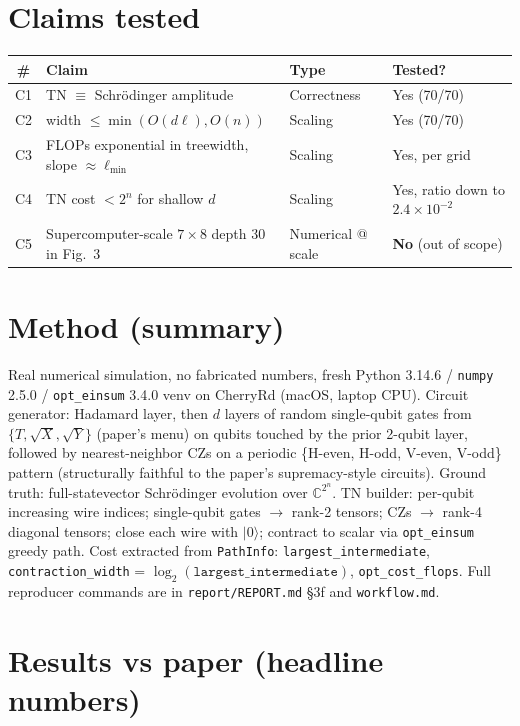 \documentclass[11pt]{article}
\begin{document}
\section{Claims tested}
\begin{center}\small
\begin{tabular}{clll}
\toprule
\# & Claim & Type & Tested? \\
\midrule
C1 & TN $\equiv$ Schr\"odinger amplitude & Correctness & Yes (70/70) \\
C2 & width $\le \min(O(d\ell), O(n))$ & Scaling & Yes (70/70) \\
C3 & FLOPs exponential in treewidth, slope $\approx \ell_{\min}$ & Scaling & Yes, per grid \\
C4 & TN cost $<2^n$ for shallow $d$ & Scaling & Yes, ratio down to $2.4{\times}10^{-2}$ \\
C5 & Supercomputer-scale $7{\times}8$ depth 30 in Fig.~3 & Numerical @ scale & \textbf{No} (out of scope) \\
\bottomrule
\end{tabular}
\end{center}

\section{Method (summary)}
Real numerical simulation, no fabricated numbers, fresh Python
3.14.6 / \texttt{numpy} 2.5.0 / \texttt{opt\_einsum} 3.4.0 venv on CherryRd
(macOS, laptop CPU). Circuit generator: Hadamard layer, then $d$ layers of
random single-qubit gates from $\{T, \sqrt{X}, \sqrt{Y}\}$ (paper's menu) on
qubits touched by the prior 2-qubit layer, followed by nearest-neighbor CZs
on a periodic \{H-even, H-odd, V-even, V-odd\} pattern (structurally faithful
to the paper's supremacy-style circuits). Ground truth: full-statevector
Schr\"odinger evolution over $\mathbb{C}^{2^n}$. TN builder: per-qubit
increasing wire indices; single-qubit gates $\to$ rank-2 tensors; CZs $\to$
rank-4 diagonal tensors; close each wire with $|0\rangle$; contract to scalar
via \texttt{opt\_einsum} greedy path. Cost extracted from \texttt{PathInfo}:
\texttt{largest\_intermediate}, \texttt{contraction\_width} =
$\log_2(\texttt{largest\_intermediate})$, \texttt{opt\_cost\_flops}. Full
reproducer commands are in \texttt{report/REPORT.md} \S3f and
\texttt{workflow.md}.

\section{Results vs paper (headline numbers)}
\end{document}
